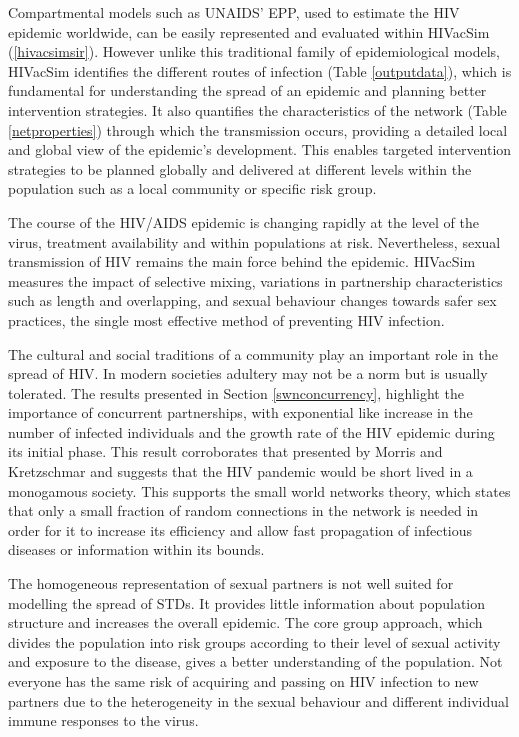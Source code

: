 Compartmental models such as UNAIDS' EPP, used to estimate the HIV epidemic worldwide,
can be easily represented and evaluated within HIVacSim (\ref{hivacsimsir}). However
unlike this traditional family of epidemiological models, HIVacSim identifies the
different routes of infection (Table \ref{outputdata}), which is fundamental for
understanding the spread of an epidemic and planning better intervention strategies. It
also quantifies the characteristics of the network (Table \ref{netproperties}) through
which the transmission occurs, providing a detailed local and global view of the
epidemic's development. This enables targeted intervention strategies to be planned
globally and delivered at different levels within the population such as a local
community or specific risk group.

The course of the HIV/AIDS epidemic is changing rapidly at the level of the virus,
treatment availability and within populations at risk. Nevertheless, sexual transmission
of HIV remains the main force behind the epidemic. HIVacSim measures the impact of
selective mixing, variations in partnership characteristics such as length and
overlapping, and sexual behaviour changes towards safer sex practices, the single most
effective method of preventing HIV infection.

The cultural and social traditions of a community play an important role in the spread of
HIV. In modern societies adultery may not be a norm but is usually tolerated. The results
presented in Section \ref{swnconcurrency}, highlight the importance of concurrent
partnerships, with exponential like increase in the number of infected individuals and
the growth rate of the HIV epidemic during its initial phase. This result corroborates
that presented by Morris and Kretzschmar \cite{morrism1997,Kretzschmar2000} and suggests
that the HIV pandemic would be short lived in a monogamous society. This supports the
small world networks theory, which states that only a small fraction of random
connections in the network is needed in order for it to increase its efficiency and allow
fast propagation of infectious diseases or information within its bounds.

The homogeneous representation of sexual partners is not well suited for modelling the
spread of STDs. It provides little information about population structure and
increases the overall epidemic. The core group approach, which divides the population
into risk groups according to their level of sexual activity and exposure to the disease,
gives a better understanding of the population. Not everyone has the same risk of
acquiring and passing on HIV infection to new partners due to the heterogeneity in the
sexual behaviour and different individual immune responses to the virus.

